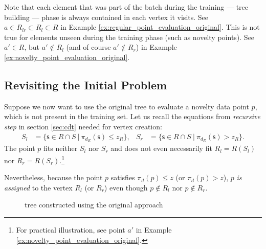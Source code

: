Note that each element that was part of the batch during the training --- tree building --- phase is always contained in each vertex it visits. See $a \in R_{lr} \subset R_{l} \subset R$ in Example \ref{ex:regular_point_evaluation_original}.
This is not true for elements unseen during the training phase (such as novelty points).
See $a' \in R$, but $a' \notin R_l$ (and of course $a' \notin R_r$) in Example \ref{ex:novelty_point_evaluation_original}.

\subsection{Revisiting the Initial Problem}
\label{sec:revisiting}
Suppose we now want to use the original tree to evaluate a novelty data point $p$, which is not present in the training set.
Let us recall the equations from \textit{recursive step} in section \ref{sec:cdt} needed for vertex creation:
\begin{align*}
S_l &= \{ \mathsf{s} \in{R \cap S}\ |\ \pi_{d_R}(\mathsf{s})\le z_R\},&
S_r &= \{ \mathsf{s} \in{R \cap S}\ |\ \pi_{d_R}(\mathsf{s}) > z_R\}.
\end{align*}
The point $p$ fits neither $S_l$ nor $S_r$ and does not even necessarily fit $R_l = R(S_l)$ nor $R_r = R(S_r)$.\footnote{For practical illustration, see point $a'$ in Example \ref{ex:novelty_point_evaluation_original}.}

Nevertheless, because the point $p$ satisfies  $\pi_d(p) \le z$ (or $\pi_d(p) > z$), $p$ \emph{is assigned} to the vertex $R_l$ (or $R_r$) even though $p \notin R_l$ nor $p \notin R_r$.


\begin{sidewaysfigure}[htbp]
\centering

\caption{tree constructed using the original approach}
\label{fig:example_noutlier_tree_color}
\end{sidewaysfigure}
